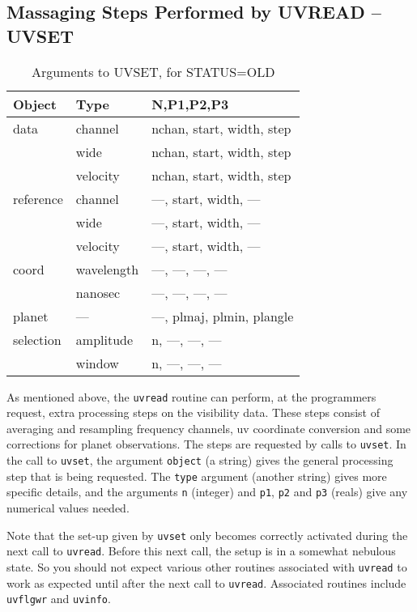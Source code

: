 \subsection{Massaging Steps Performed by UVREAD -- UVSET}
\label{sect:uvset}
\begin{table}\centering
\begin{tabular}{|l|l|l|}					   \hline
\bf Object	& \bf Type	& \bf N,P1,P2,P3		\\ \hline
data		& channel	& nchan, start, width, step	\\
		& wide		& nchan, start, width, step	\\
		& velocity	& nchan, start, width, step	\\
reference	& channel	&  ---, start, width, ---	\\
		& wide		&  ---, start, width, ---	\\
		& velocity	&  ---, start, width, ---	\\
coord		& wavelength	&  ---, ---, ---, ---		\\
		& nanosec	&  ---, ---, ---, ---		\\
planet		& ---		&  ---, plmaj, plmin, plangle	\\
selection	& amplitude	&  n, ---, ---, ---		\\
		& window	&  n, ---, ---, ---		\\ \hline
\end{tabular}
\caption{Arguments to UVSET, for STATUS=OLD}
\label{t:uvset-old}\end{table}
As mentioned above, the {\tt uvread} routine can perform, at the programmers
request, extra processing steps on the visibility data. These steps
consist of averaging and
resampling frequency channels, uv coordinate conversion and some corrections for
planet observations. The
steps are requested by calls to {\tt uvset}. In the call to {\tt uvset},
the argument {\tt object} (a string) gives the general processing step that
is being requested. The {\tt type} argument (another string)
gives more specific details, and the arguments {\tt n} (integer)
and {\tt p1}, {\tt p2} and {\tt p3} (reals) give any numerical values
needed.

Note that the set-up given by {\tt uvset} only becomes correctly
activated during the next call to {\tt uvread}. Before this next call,
the setup is in a somewhat nebulous state. So you should not expect
various other routines associated with {\tt uvread} to work
as expected until after the next call to {\tt uvread}. Associated
routines include {\tt uvflgwr} and {\tt uvinfo}.

